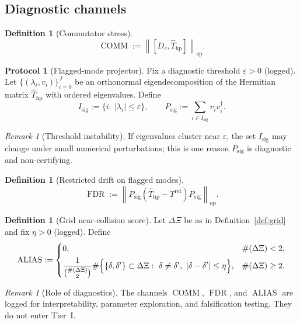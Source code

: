 \documentclass[12pt,reqno]{amsart}
\numberwithin{equation}{section}
\theoremstyle{definition}
\newtheorem{definition}[theorem]{Definition}
\newtheorem{protocol}[theorem]{Protocol}
\theoremstyle{remark}
\newtheorem{remark}[theorem]{Remark}
\newcommand{\opnorm}[1]{\left\|#1\right\|_{\mathrm{op}}}
\DeclareMathOperator{\COMM}{COMM}
\DeclareMathOperator{\FDR}{FDR}
\DeclareMathOperator{\ALIAS}{ALIAS}
\begin{document}
\subsection{Diagnostic channels}
\begin{definition}[Commutator stress]
\label{def:comm}
\[
\COMM := \opnorm{[D_c,\widehat T_{\mathrm{hp}}]}.
\]
\end{definition}

\begin{protocol}[Flagged-mode projector]
\label{proto:psig}
Fix a diagnostic threshold $\varepsilon>0$ (logged). Let
$\{(\lambda_i,v_i)\}_{i=0}^J$ be an orthonormal eigendecomposition of the Hermitian
matrix $\widehat T_{\mathrm{hp}}$ with ordered eigenvalues. Define
\[
I_{\mathrm{sig}} := \{i:\ |\lambda_i|\le\varepsilon\},
\qquad
P_{\mathrm{sig}} := \sum_{i\in I_{\mathrm{sig}}} v_i v_i^\dagger.
\]
\end{protocol}

\begin{remark}[Threshold instability]
If eigenvalues cluster near $\varepsilon$, the set $I_{\mathrm{sig}}$ may change
under small numerical perturbations; this is one reason $P_{\mathrm{sig}}$ is
diagnostic and non-certifying.
\end{remark}

\begin{definition}[Restricted drift on flagged modes]
\label{def:fdr}
\[
\FDR := \opnorm{P_{\mathrm{sig}}(\widehat T_{\mathrm{hp}}-T^{\mathrm{ref}})P_{\mathrm{sig}}}.
\]
\end{definition}

\begin{definition}[Grid near-collision score]
\label{def:alias}
Let $\Delta\Xi$ be as in Definition~\ref{def:grid} and fix $\eta>0$ (logged). Define
\[
\ALIAS :=
\begin{cases}
0, & \#(\Delta\Xi)<2,\\[4pt]
\displaystyle
\frac{1}{\binom{\#(\Delta\Xi)}{2}}
\#\Bigl\{\{\delta,\delta'\}\subset\Delta\Xi:\ \delta\neq\delta',\ |\delta-\delta'|\le\eta\Bigr\},
& \#(\Delta\Xi)\ge2.
\end{cases}
\]
\end{definition}

\begin{remark}[Role of diagnostics]
The channels $\COMM$, $\FDR$, and $\ALIAS$ are logged for interpretability,
parameter exploration, and falsification testing. They do not enter Tier~I.
\end{remark}
\end{document}
